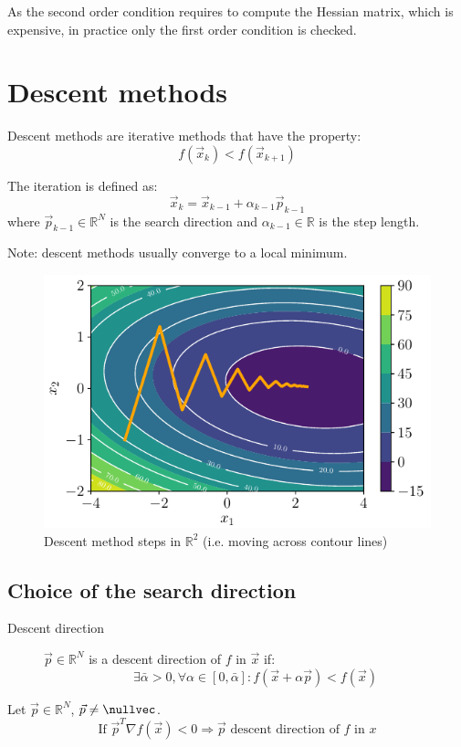 As the second order condition requires to compute the Hessian matrix, which is expensive, in practice only the first order condition is checked.



\section{Descent methods}

Descent methods are iterative methods that have the property:
\[ f(\vec{x}_k) < f(\vec{x}_{k+1}) \]

The iteration is defined as:
\[ \vec{x}_k = \vec{x}_{k-1} + \alpha_{k-1}\vec{p}_{k-1} \]
where $\vec{p}_{k-1} \in \mathbb{R}^N$ is the search direction and 
$\alpha_{k-1} \in \mathbb{R}$ is the step length.

Note: descent methods usually converge to a local minimum.

\begin{figure}
    \centering
    \includegraphics[width=0.5\linewidth]{img/_gradient_contour.pdf}
    \caption{Descent method steps in $\mathbb{R}^2$ (i.e. moving across contour lines)}
\end{figure}


\subsection{Choice of the search direction}

\begin{description}
    \item[Descent direction] 
        $\vec{p} \in \mathbb{R}^N$ is a descent direction of $f$ in $\vec{x}$ if:
        \[ \exists \bar{\alpha} > 0, \forall \alpha \in [0, \bar{\alpha}]: f(\vec{x} + \alpha \vec{p}) < f(\vec{x}) \]
\end{description}

\begin{theorem}
    Let $\vec{p} \in \mathbb{R}^N$, $\vec{p} \neq \nullvec$.
    \[ \text{If } \vec{p}^T \nabla f(\vec{x}) < 0 \Rightarrow \vec{p} \text{ descent direction of } f \text{ in } x \]
\end{theorem}

